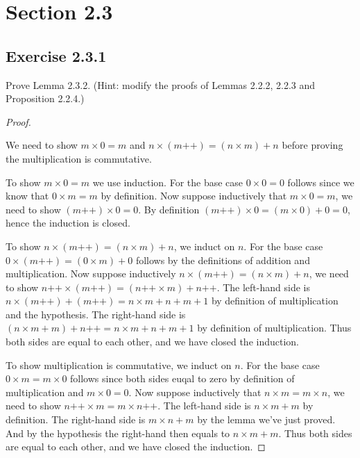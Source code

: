 \documentclass[a4paper]{article}
\begin{document}
\section*{Section 2.3}

\subsection*{Exercise 2.3.1}

Prove Lemma 2.3.2. (Hint: modify the proofs of Lemmas 2.2.2, 2.2.3 and Proposition 2.2.4.)

\begin{proof}

$ $\newline

We need to show $m \times 0 = m$ and $n \times \left(  m\text{++} \right) = \left( n\times m \right) + n$ before proving the multiplication is commutative.

To show $m\times 0 = m$ we use induction. For the base case $0\times 0 = 0$ follows since we know that $0\times m = m$ by definition. Now suppose inductively that $m\times 0 = m$, we need to show $\left( m\text{++} \right) \times 0 = 0$. By definition $\left( m\text{++} \right) \times 0 = \left( m\times 0 \right) + 0 = 0$, hence the induction is closed.

To show $n \times \left(  m\text{++} \right) = \left( n\times m \right) + n$, we induct on  $n$. For the base case $0 \times \left( m\text{++} \right) = \left( 0 \times m \right) + 0$ follows by the definitions of addition and multiplication. Now suppose inductively $n \times \left(  m\text{++} \right) = \left( n\times m \right) + n$, we need to show $n\text{++} \times \left(  m\text{++} \right) = \left( n\text{++}\times m \right) + n\text{++}$. The left-hand side is $n\times \left( m\text{++} \right) + \left( m\text{++} \right) = n\times m + n + m + 1$ by definition of multiplication and the hypothesis. The right-hand side is $\left( n\times m + m \right) + n\text{++} = n\times m + n + m + 1$ by definition of multiplication. Thus both sides are equal to each other, and we have closed the induction.

To show multiplication is commutative, we induct on $n$. For the base case $0\times m = m\times 0$ follows since both sides euqal to zero by definition of multiplication and $m\times 0 = 0$. Now suppose inductively that $n \times m = m\times n$, we need to show $n\text{++}\times m = m\times n\text{++}$. The left-hand side is $n\times m + m$ by definition. The right-hand side is $m\times n + m$ by the lemma we've just proved. And by the hypothesis the right-hand then equals to $n\times m + m$. Thus both sides are equal to each other, and we have closed the induction.

\end{proof}
\end{document}
